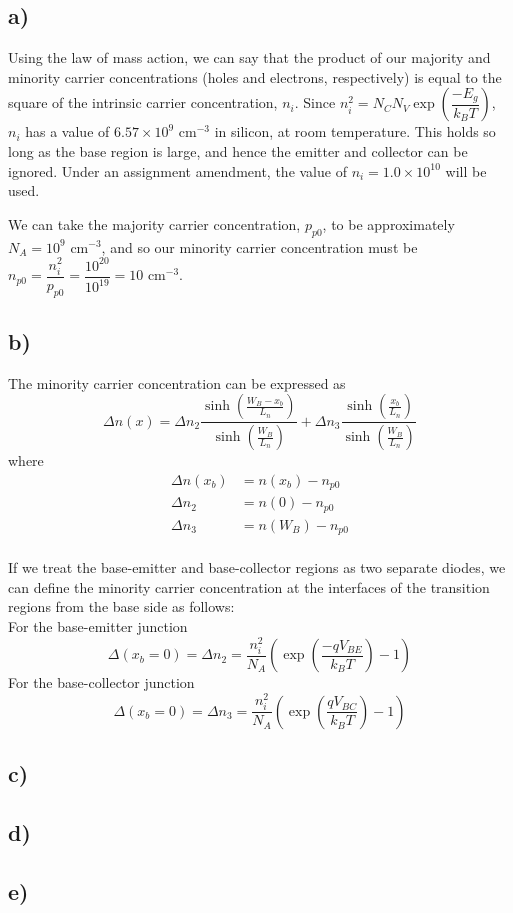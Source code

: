 \subsection*{a)}
	Using the law of mass action, we can say that the product of our majority and minority carrier concentrations (holes and electrons, respectively) is equal to the square of the intrinsic carrier concentration, $n_i$. Since $n_i^2 = N_C N_V \exp\left(\dfrac{-E_g}{k_B T}\right)$, $n_i$ has a value of $6.57 \times 10^{9} \textrm{ cm}^{-3}$ in silicon, at room temperature. This holds so long as the base region is large, and hence the emitter and collector can be ignored. Under an assignment amendment, the value of $n_i = 1.0 \times 10^{10}$ will be used.
	
	We can take the majority carrier concentration, $p_{p0}$, to be approximately $N_A = 10^9 \textrm{ cm}^{-3}$, and so our minority carrier concentration must be $n_{p0} = \dfrac{n_i^2}{p_{p0}} = \dfrac{10^{20}}{10^{19}} = 10 \textrm{ cm}^{-3}$.
\subsection*{b)}
	The minority carrier concentration can be expressed as
	$$\Delta n(x) = 
	\Delta n_2 \frac{\sinh\left(\frac{W_B - x_b}{L_n}\right)}{\sinh\left(\frac{W_B}{L_n}\right)} + 
	\Delta n_3 \frac{\sinh\left(\frac{x_b}{L_n}\right)}{\sinh\left(\frac{W_B}{L_n}\right)}
	$$	
	where
	\[
		\begin{aligned}
		\Delta n(x_b) &= n(x_b) - n_{p0} \\
		\Delta n_2  &= n(0) - n_{p0} \\
		\Delta n_3  &= n(W_B) - n_{p0} \\	
		\end{aligned}
	\]
	
	If we treat the base-emitter and base-collector regions as two separate diodes, we can define the minority carrier concentration at the interfaces of the transition regions from the base side as follows: \\
	
	\noindent For the base-emitter junction
	$$\Delta(x_b = 0) = \Delta n_2 
			= \frac{n_i^2}{N_A}
			 \left(
				\exp{\left(
					\frac{- q V_{BE}}{k_B T}				
				\right)} - 1
			\right)
	$$
	For the base-collector junction
	$$\Delta(x_b = 0) = \Delta n_3
	= \frac{n_i^2}{N_A}
	\left(
		\exp{\left(
			\dfrac{q V_{BC}}{k_B T}				
		\right)} - 1
	\right)
	$$
	
\subsection*{c)}
\subsection*{d)}
\subsection*{e)}